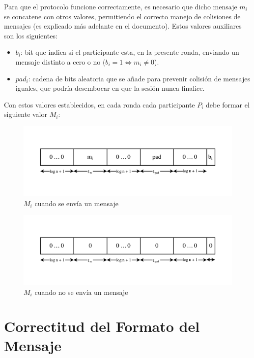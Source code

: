 Para que el protocolo funcione correctamente, es necesario que dicho mensaje $m_i$ 
se concatene con otros valores, permitiendo el correcto manejo de colisiones de 
mensajes (es explicado más adelante en el documento). Estos valores auxiliares son 
los siguientes:
\begin{itemize}
    \item $b_i$: bit que indica si el participante esta, en la presente ronda, 
    enviando un mensaje distinto a cero o no ($b_i = 1 \iff m_i \neq 0$).
    \item $pad_i$: cadena de bits aleatoria que se añade para prevenir colisión 
    de mensajes iguales, que podría desembocar en que la sesión nunca finalice.
\end{itemize}

Con estos valores establecidos, en cada ronda cada participante $P_i$ debe formar 
el siguiente valor $M_i$:

\begin{figure}[H]
  \centering
    \includegraphics[width=1\textwidth]{imagenes/message-format(1).pdf}
  \caption{$M_i$ cuando se envía un mensaje}
\end{figure}

\begin{figure}[H]
  \centering
    \includegraphics[width=1\textwidth]{imagenes/message-format-nomessage.pdf}
  \caption{$M_i$ cuando no se envía un mensaje}
\end{figure}

\section{Correctitud del Formato del Mensaje}


